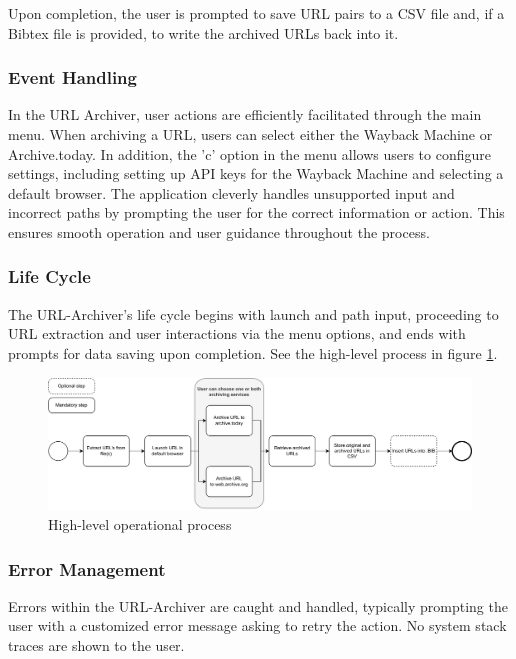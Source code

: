 Upon completion, the user is prompted to save URL pairs to a CSV file and, if a Bibtex file is provided, to write the archived URLs back into it. 


\subsubsection{Event Handling}
In the URL Archiver, user actions are efficiently facilitated through the main menu. When archiving a URL, users can select either the Wayback Machine or Archive.today. In addition, the 'c' option in the menu allows users to configure settings, including setting up API keys for the Wayback Machine and selecting a default browser. The application cleverly handles unsupported input and incorrect paths by prompting the user for the correct information or action. This ensures smooth operation and user guidance throughout the process.

\subsubsection{Life Cycle}
The URL-Archiver’s life cycle begins with launch and path input, proceeding to URL extraction and user interactions via the menu options, and ends with prompts for data saving upon completion. See the high-level process in figure \ref{fig:hl_operational_process}.

\begin{figure}
	\includegraphics[width=1\textwidth]{./diagrams/process_model-simple-horizontal.pdf}
	\centering
	\caption{High-level operational process}
	\label{fig:hl_operational_process}
\end{figure}

\subsubsection{Error Management}
Errors within the URL-Archiver are caught and handled, typically prompting the user with a customized error message asking to retry the action. No system stack traces are shown to the user.

